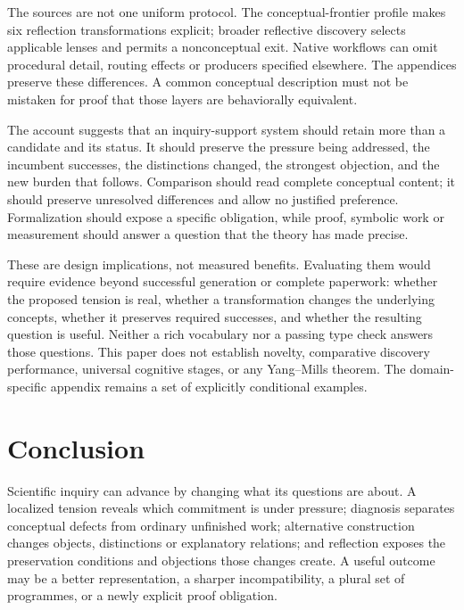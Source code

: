 The sources are not one uniform protocol. The conceptual-frontier profile makes
six reflection transformations explicit; broader reflective discovery selects
applicable lenses and permits a nonconceptual exit. Native workflows can omit
procedural detail, routing effects or producers specified elsewhere. The
appendices preserve these differences. A common conceptual description must not
be mistaken for proof that those layers are behaviorally equivalent.

The account suggests that an inquiry-support system should retain more than a
candidate and its status. It should preserve the pressure being addressed, the
incumbent successes, the distinctions changed, the strongest objection, and the
new burden that follows. Comparison should read complete conceptual content;
it should preserve unresolved differences and allow no justified preference.
Formalization should expose a specific obligation, while proof, symbolic work
or measurement should answer a question that the theory has made precise.

These are design implications, not measured benefits. Evaluating them would
require evidence beyond successful generation or complete paperwork: whether
the proposed tension is real, whether a transformation changes the underlying
concepts, whether it preserves required successes, and whether the resulting
question is useful. Neither a rich vocabulary nor a passing type check answers
those questions. This paper does not establish novelty, comparative discovery
performance, universal cognitive stages, or any Yang--Mills theorem. The
domain-specific appendix remains a set of explicitly conditional examples.

\section{Conclusion}
Scientific inquiry can advance by changing what its questions are about. A
localized tension reveals which commitment is under pressure; diagnosis separates
conceptual defects from ordinary unfinished work; alternative construction changes
objects, distinctions or explanatory relations; and reflection exposes the
preservation conditions and objections those changes create. A useful outcome may
be a better representation, a sharper incompatibility, a plural set of programmes,
or a newly explicit proof obligation.

